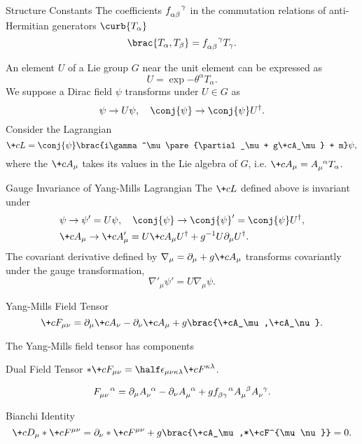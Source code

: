 \documentclass[hidelinks]{article}
\begin{document}
\begin{termdef}{Structure Constants}
    The coefficients $\tensor{f}{_\alpha_\beta^\gamma}$ in the commutation relations of anti-Hermitian generators $\curb{T_\alpha}$
    \[ \brac{T_\alpha,T_\beta} = \tensor{f}{_\alpha_\beta^\gamma}T_\gamma. \]
\end{termdef}
An element $U$ of a Lie group $G$ near the unit element can be expressed as
\[ U = \exp{-\theta^\alpha T_\alpha}. \]
We suppose a Dirac field $\psi$ transforms under $U\in G$ as
\[ \psi \rightarrow U\psi,\quad \conj{\psi} \rightarrow \conj{\psi}U^\dagger. \]
Consider the Lagrangian
\[ \+cL = \conj{\psi}\brac{i\gamma^\mu\pare{\partial_\mu + g\+cA_\mu} + m}\psi, \]
where the  $\+cA_\mu$ takes its values in the Lie algebra of $G$, i.e. $\+cA_\mu = \tensor{A}{_\mu^\alpha}T_\alpha$.
\begin{finaleq}{Gauge Invariance of Yang-Mills Lagrangian}
    The $\+cL$ defined above is invariant under
    \begin{align*}
        & \psi \rightarrow \psi' = U\psi,\quad \conj{\psi} \rightarrow \conj{\psi}' = \conj{\psi}U^\dagger, \\
        & \+cA_\mu \rightarrow \+cA'_\mu = U\+cA_\mu U^\dagger + g^{-1}U\partial_\mu U^\dagger.
    \end{align*}
    The covariant derivative defined by $\nabla_\mu = \partial_\mu + g\+cA_\mu$ transforms covariantly under the gauge transformation,
    \[ \nabla'_\mu \psi' = U\nabla_\mu \psi. \]
\end{finaleq}
\begin{termdef}{Yang-Mills Field Tensor}
    \[ \+cF_{\mu\nu} = \partial_\mu \+cA_\nu - \partial_\nu \+cA_\mu + g\brac{\+cA_\mu,\+cA_\nu}. \]
\end{termdef}
The Yang-Mills field tensor has components \begin{margindef}{Dual Field Tensor}
    $\displaystyle *\+cF_{\mu\nu} = \half \epsilon_{\mu\nu\kappa\lambda}\+cF^{\kappa\lambda}$.
\end{margindef}
\[ \tensor{F}{_\mu_\nu^\alpha} = \partial_\mu \tensor{A}{_\nu^\alpha} - \partial_\nu \tensor{A}{_\mu^\alpha} + g\tensor{f}{_\beta_\gamma^\alpha}\tensor{A}{_\mu^\beta}\tensor{A}{_\nu^\gamma}. \]
\vspace{-\baselineskip}
\begin{finaleq}{Bianchi Identity}
    \[ \+cD_\mu * \+cF^{\mu\nu} = \partial_\nu * \+cF^{\mu\nu} + g\brac{\+cA_\mu,*\+cF^{\mu\nu}} = 0. \]
\end{finaleq}
\end{document}
